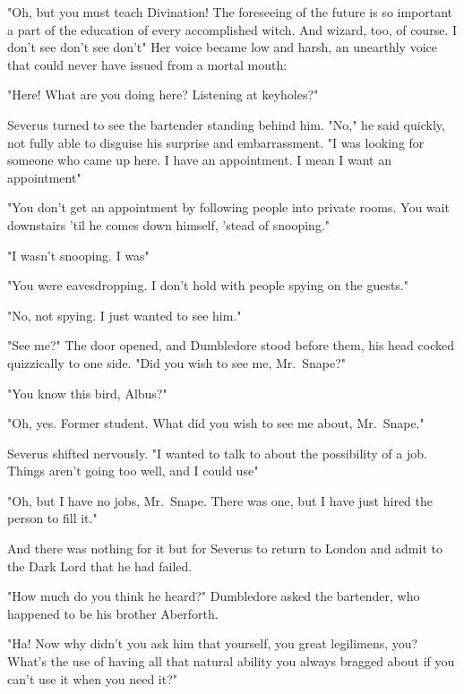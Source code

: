 "Oh, but you must teach Divination! The foreseeing of the future is so important a part of the education of every accomplished witch. And wizard, too, of course. I don't see{\el} don't see{\el} don't{\el}" Her voice became low and harsh, an unearthly voice that could never have issued from a mortal mouth:



"Here! What are you doing here? Listening at keyholes?"

Severus turned to see the bartender standing behind him. "No," he said quickly, not fully able to disguise his surprise and embarrassment. "I was looking for someone who came up here. I have an appointment. I mean I want an appointment{\el}"

"You don't get an appointment by following people into private rooms. You wait downstairs 'til he comes down himself, 'stead of snooping."

"I wasn't snooping. I was{\el}"

"You were eavesdropping. I don't hold with people spying on the guests."

"No, not spying. I just wanted to see him."

"See me?" The door opened, and Dumbledore stood before them, his head cocked quizzically to one side. "Did you wish to see me, Mr.~Snape?"

"You know this bird, Albus?"

"Oh, yes. Former student. What did you wish to see me about, Mr.~Snape."

Severus shifted nervously. "I wanted to talk to about the possibility of a job. Things aren't going too well, and I could use{\el}"

"Oh, but I have no jobs, Mr.~Snape. There was one, but I have just hired the person to fill it."

And there was nothing for it but for Severus to return to London and admit to the Dark Lord that he had failed.

"How much do you think he heard?" Dumbledore asked the bartender, who happened to be his brother Aberforth.

"Ha! Now why didn't you ask him that yourself, you great legilimens, you? What's the use of having all that natural ability you always bragged about if you can't use it when you need it?"


